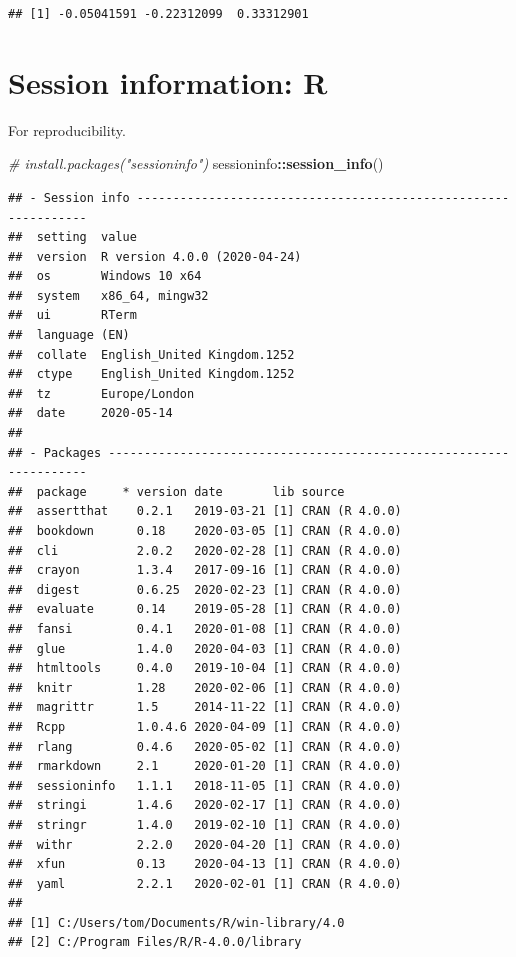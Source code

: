 \documentclass[
  10pt,
]{book}
\newenvironment{Shaded}{\begin{snugshade}}{\end{snugshade}}
\newcommand{\CommentTok}[1]{\textcolor[rgb]{0.56,0.35,0.01}{\textit{#1}}}
\newcommand{\KeywordTok}[1]{\textcolor[rgb]{0.13,0.29,0.53}{\textbf{#1}}}
\newcommand{\NormalTok}[1]{#1}
\newcommand{\OperatorTok}[1]{\textcolor[rgb]{0.81,0.36,0.00}{\textbf{#1}}}
\begin{document}
\begin{verbatim}
## [1] -0.05041591 -0.22312099  0.33312901
\end{verbatim}

\hypertarget{session-information-r}{%
\chapter*{Session information: R}\label{session-information-r}}

For reproducibility.

\begin{Shaded}
\begin{Highlighting}[]
\CommentTok{\# install.packages("sessioninfo")}
\NormalTok{sessioninfo}\OperatorTok{::}\KeywordTok{session\_info}\NormalTok{()}
\end{Highlighting}
\end{Shaded}

\begin{verbatim}
## - Session info ---------------------------------------------------------------
##  setting  value                       
##  version  R version 4.0.0 (2020-04-24)
##  os       Windows 10 x64              
##  system   x86_64, mingw32             
##  ui       RTerm                       
##  language (EN)                        
##  collate  English_United Kingdom.1252 
##  ctype    English_United Kingdom.1252 
##  tz       Europe/London               
##  date     2020-05-14                  
## 
## - Packages -------------------------------------------------------------------
##  package     * version date       lib source        
##  assertthat    0.2.1   2019-03-21 [1] CRAN (R 4.0.0)
##  bookdown      0.18    2020-03-05 [1] CRAN (R 4.0.0)
##  cli           2.0.2   2020-02-28 [1] CRAN (R 4.0.0)
##  crayon        1.3.4   2017-09-16 [1] CRAN (R 4.0.0)
##  digest        0.6.25  2020-02-23 [1] CRAN (R 4.0.0)
##  evaluate      0.14    2019-05-28 [1] CRAN (R 4.0.0)
##  fansi         0.4.1   2020-01-08 [1] CRAN (R 4.0.0)
##  glue          1.4.0   2020-04-03 [1] CRAN (R 4.0.0)
##  htmltools     0.4.0   2019-10-04 [1] CRAN (R 4.0.0)
##  knitr         1.28    2020-02-06 [1] CRAN (R 4.0.0)
##  magrittr      1.5     2014-11-22 [1] CRAN (R 4.0.0)
##  Rcpp          1.0.4.6 2020-04-09 [1] CRAN (R 4.0.0)
##  rlang         0.4.6   2020-05-02 [1] CRAN (R 4.0.0)
##  rmarkdown     2.1     2020-01-20 [1] CRAN (R 4.0.0)
##  sessioninfo   1.1.1   2018-11-05 [1] CRAN (R 4.0.0)
##  stringi       1.4.6   2020-02-17 [1] CRAN (R 4.0.0)
##  stringr       1.4.0   2019-02-10 [1] CRAN (R 4.0.0)
##  withr         2.2.0   2020-04-20 [1] CRAN (R 4.0.0)
##  xfun          0.13    2020-04-13 [1] CRAN (R 4.0.0)
##  yaml          2.2.1   2020-02-01 [1] CRAN (R 4.0.0)
## 
## [1] C:/Users/tom/Documents/R/win-library/4.0
## [2] C:/Program Files/R/R-4.0.0/library
\end{verbatim}
\end{document}
